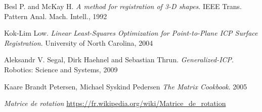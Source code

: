 \documentclass[11pt,letterpaper,leqno]{article}
\begin{document}
\break

\begin{thebibliography}{9}

    Besl P. and McKay H.
    \textit{A method for registration of 3-D shapes}. 
    IEEE Trans. Pattern Anal. Mach. Intell., 1992

    Kok-Lim Low.
    \textit{Linear Least-Squares Optimization for
    Point-to-Plane ICP Surface Registration}. 
    University of North Carolina, 2004

    Aleksandr V. Segal, Dirk Haehnel and Sebastian Thrun.
    \textit{Generalized-ICP}. 
    Robotics: Science and Systems, 2009

    Kaare Brandt Petersen, Michael Syskind Pedersen
    \textit{The Matrix Cookbook}. 2005

    \textit{Matrice de rotation} \url{https://fr.wikipedia.org/wiki/Matrice_de_rotation}

\end{thebibliography}
\end{document}
